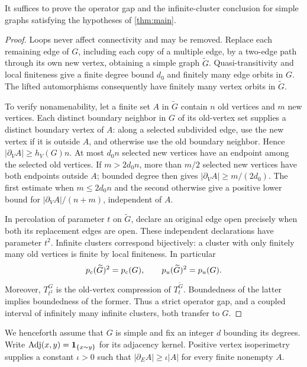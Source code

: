 \begin{lemma}\label{pre:simple-reduction}
It suffices to prove the operator gap and the infinite-cluster conclusion
for simple graphs satisfying the hypotheses of \cref{thm:main}.
\end{lemma}
\begin{proof}
Loops never affect connectivity and may be removed. Replace each remaining
edge of $G$, including each copy of a multiple edge, by a two-edge path
through its own new vertex, obtaining a simple graph $\widetilde G$.
Quasi-transitivity and local finiteness give a finite degree bound $d_0$
and finitely many edge orbits in $G$. The lifted automorphisms consequently
have finitely many vertex orbits in $\widetilde G$.

To verify nonamenability, let a finite set $A$ in $\widetilde G$ contain
$n$ old vertices and $m$ new vertices. Each distinct boundary neighbor in
$G$ of its old-vertex set supplies a distinct boundary vertex of $A$:
along a selected subdivided edge, use the new vertex if it is outside
$A$, and otherwise use the old boundary neighbor. Hence
$|\partial_V A|\ge h_V(G)n$. At most $d_0n$ selected new vertices have
an endpoint among the selected old vertices. If $m>2d_0n$, more than
$m/2$ selected new vertices have both endpoints outside $A$; bounded
degree then gives $|\partial_V A|\ge m/(2d_0)$. The first estimate when
$m\le2d_0n$ and the second otherwise give a positive lower bound for
$|\partial_V A|/(n+m)$, independent of $A$.

In percolation of parameter $t$ on $\widetilde G$, declare an original
edge open precisely when both its replacement edges are open. These
independent declarations have parameter $t^2$. Infinite clusters
correspond bijectively: a cluster with only finitely many old vertices
is finite by local finiteness. In particular
\[
 {p_c}(\widetilde G)^2={p_c}(G),\qquad
 {p_u}(\widetilde G)^2={p_u}(G).
\]
Moreover, $T_{t^2}^G$ is the old-vertex compression of
$T_t^{\widetilde G}$. Boundedness of the latter implies boundedness of
the former. Thus a strict operator gap, and a coupled interval of
infinitely many infinite clusters, both transfer to $G$.
\end{proof}

We henceforth assume that $G$ is simple and fix an integer $d$ bounding
its degrees. Write $\operatorname{Adj}(x,y)=\mathbf 1_{\{x\sim y\}}$ for its adjacency kernel.
Positive vertex isoperimetry supplies a constant $\iota>0$
such that $|\partial_E A|\ge\iota|A|$ for every finite nonempty $A$.


